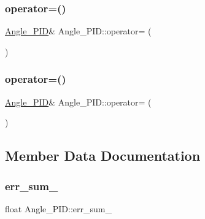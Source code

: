 \subsubsection{\texorpdfstring{operator=()}{operator=()}\hspace{0.1cm}{\footnotesize\ttfamily [1/2]}}
{\footnotesize\ttfamily \mbox{\hyperlink{class_angle___p_i_d}{Angle\+\_\+\+P\+ID}}\& Angle\+\_\+\+P\+I\+D\+::operator= (\begin{DoxyParamCaption}\item[{\mbox{\hyperlink{class_angle___p_i_d}{Angle\+\_\+\+P\+ID}} \&\&}]{ }\end{DoxyParamCaption})\hspace{0.3cm}{\ttfamily [default]}}

\mbox{\label{class_angle___p_i_d_a6f3d083d91de2de8e8a36204f375f279}} 
\subsubsection{\texorpdfstring{operator=()}{operator=()}\hspace{0.1cm}{\footnotesize\ttfamily [2/2]}}
{\footnotesize\ttfamily \mbox{\hyperlink{class_angle___p_i_d}{Angle\+\_\+\+P\+ID}}\& Angle\+\_\+\+P\+I\+D\+::operator= (\begin{DoxyParamCaption}\item[{const \mbox{\hyperlink{class_angle___p_i_d}{Angle\+\_\+\+P\+ID}} \&}]{ }\end{DoxyParamCaption})\hspace{0.3cm}{\ttfamily [default]}}



\subsection{Member Data Documentation}
\mbox{\label{class_angle___p_i_d_a5c0c630668fdf19208e51d1fc404d21d}} 
\subsubsection{\texorpdfstring{err\_sum\_}{err\_sum\_}}
{\footnotesize\ttfamily float Angle\+\_\+\+P\+I\+D\+::err\+\_\+sum\+\_\+\hspace{0.3cm}{\ttfamily [private]}}



